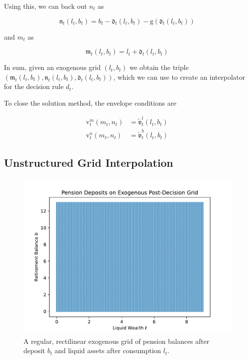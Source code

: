 \documentclass{article}
\newcommand{\bRat}{b}
\newcommand{\vFunc}{\mathrm{v}}
\newcommand{\mRat}{m}
\newcommand{\vOpt}{\tilde{\mathfrak{v}}}
\newcommand{\mEndFunc}{\mathfrak{m}}
\newcommand{\nRat}{n}
\newcommand{\dRat}{d}
\newcommand{\gFunc}{\mathrm{g}}
\newcommand{\lRat}{l}
\newcommand{\dEndFunc}{\mathfrak{d}}
\newcommand{\nEndFunc}{\mathfrak{n}}
\begin{document}
Using this, we can back out $\nRat_{t}$ as

\begin{equation}
\nEndFunc_{t}(\lRat_{t}, \bRat_{t}) = \bRat_{t} -
  \dEndFunc_{t}(\lRat_{t}, \bRat_{t}) - \gFunc(\dEndFunc_{t}(\lRat_{t},
    \bRat_{t}))
\end{equation}

and $\mRat_{t}$ as

\begin{equation}
\mEndFunc_{t}(\lRat_{t}, \bRat_{t}) = \lRat_{t} +
  \dEndFunc_{t}(\lRat_{t}, \bRat_{t})
\end{equation}

In sum, given an exogenous grid $(\lRat_{t}, \bRat_{t})$ we obtain the triple
$\left(\mEndFunc_{t}(\lRat_{t}, \bRat_{t}), \nEndFunc_{t}(\lRat_{t},
    \bRat_{t}), \dEndFunc_{t}(\lRat_{t}, \bRat_{t})\right)$, which
we can use to
create an interpolator for the decision rule $\dRat_{t}$.

To close the solution method, the envelope conditions are

\begin{equation}
\begin{split}
    \vFunc_{t}^{\mRat}(\mRat_{t}, \nRat_{t}) & =
    \vOpt_{t}^{\lRat}(\lRat_{t}, \bRat_{t}) \\
    \vFunc_{t}^{\nRat}(\mRat_{t}, \nRat_{t}) & =
    \vOpt_{t}^{\bRat}(\lRat_{t}, \bRat_{t})
  \end{split}
\end{equation}

\subsection{Unstructured Grid Interpolation}\label{Unstructured Grid Interpolation}

\begin{figure}[!htbp]
\centering
\includegraphics[width=0.7\linewidth]{files/ExogenousGrid-7770c20c3689cfbe6eba33b4f42fa1e4.pdf}
\caption{A regular, rectilinear exogenous grid of pension balances after deposit $\bRat_{t}$ and liquid assets after consumption $\lRat_{t}$.}
\label{fig:exog}
\end{figure}
\end{document}
